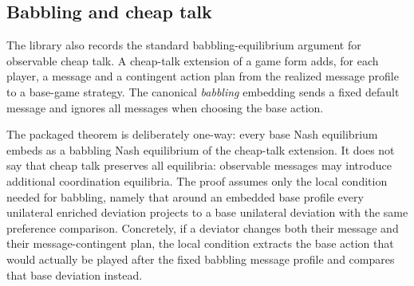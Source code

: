 
\subsection{Babbling and cheap talk}
\label{sec:solution-concepts:babbling}

The library also records the standard babbling-equilibrium argument
for observable cheap talk.  A cheap-talk extension of a game form
adds, for each player, a message and a contingent action plan from
the realized message profile to a base-game strategy.  The canonical
\emph{babbling} embedding sends a fixed default message and ignores
all messages when choosing the base action.

The packaged theorem is deliberately one-way: every base Nash
equilibrium embeds as a babbling Nash equilibrium of the cheap-talk
extension.  It does not say that cheap talk preserves all equilibria:
observable messages may introduce additional coordination equilibria.
The proof assumes only the local condition needed for babbling, namely
that around an embedded base profile every unilateral enriched
deviation projects to a base unilateral deviation with the same
preference comparison.  Concretely, if a deviator changes both their
message and their message-contingent plan, the local condition extracts
the base action that would actually be played after the fixed babbling
message profile and compares that base deviation instead.

